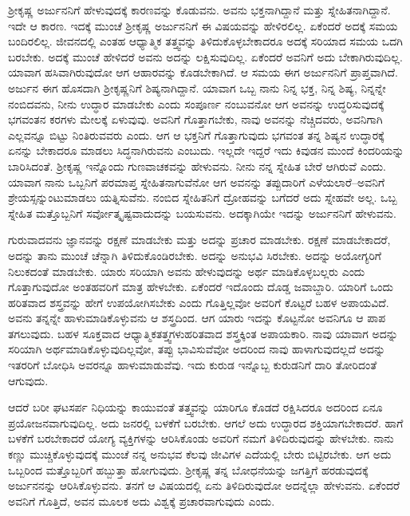 ಶ‍್ರೀಕೃಷ್ಣ ಅರ್ಜುನನಿಗೆ ಹೇಳುವುದಕ್ಕೆ ಕಾರಣವನ್ನು ಕೊಡುವನು. ಅವನು ಭಕ್ತನಾಗಿದ್ದಾನೆ ಮತ್ತು ಸ್ನೇಹಿತನಾಗಿದ್ದಾನೆ. ಇದೇ ಆ ಕಾರಣ. ಇದಕ್ಕೆ ಮುಂಚೆ ಶ‍್ರೀಕೃಷ್ಣ ಅರ್ಜುನನಿಗೆ ಈ ವಿಷಯವನ್ನು ಹೇಳಿರಲಿಲ್ಲ. ಏಕೆಂದರೆ ಅದಕ್ಕೆ ಸಮಯ ಬಂದಿರಲಿಲ್ಲ. ಜೀವನದಲ್ಲಿ ಎಂತಹ ಆಧ್ಯಾತ್ಮಿಕ ತತ್ತ್ವವನ್ನು ತಿಳಿದುಕೊಳ್ಳಬೇಕಾದರೂ ಅದಕ್ಕೆ ಸರಿಯಾದ ಸಮಯ ಒದಗಿ ಬರಬೇಕು. ಅದಕ್ಕೆ ಮುಂಚೆ ಹೇಳಿದರೆ ಅವನು ಅದನ್ನು ಲಕ್ಷಿಸುವುದಿಲ್ಲ. ಏಕೆಂದರೆ ಅವನಿಗೆ ಅದು ಬೇಕಾಗಿರುವುದಿಲ್ಲ. ಯಾವಾಗ ಹಸಿವಾಗಿರುವುದೋ ಆಗ ಆಹಾರವನ್ನು ಕೊಡಬೇಕಾಗಿದೆ. ಆ ಸಮಯ ಈಗ ಅರ್ಜುನನಿಗೆ ಪ್ರಾಪ್ತವಾಗಿದೆ. ಅರ್ಜುನ ಈಗ ಹೊಸದಾಗಿ ಶ‍್ರೀಕೃಷ್ಣನಿಗೆ ಶಿಷ್ಯನಾಗಿದ್ದಾನೆ. ಯಾವಾಗ ಒಬ್ಬ ನಾನು ನಿನ್ನ ಭಕ್ತ, ನಿನ್ನ ಶಿಷ್ಯ, ನಿನ್ನನ್ನೇ ನಂಬಿದವನು, ನೀನು ಉದ್ಧಾರ ಮಾಡಬೇಕು ಎಂದು ಸಂಪೂರ್ಣ ನಂಬುವನೋ ಆಗ ಅವನನ್ನು ಉದ್ಧರಿಸುವುದಕ್ಕೆ ಭಗವಂತನ ಕರಗಳು ಮೇಲಕ್ಕೆ ಏಳುವುವು. ಅವನಿಗೆ ಗೊತ್ತಾಗಬೇಕು, ನಾವು ಅವನನ್ನು ನೆಚ್ಚಿದವರು, ಅವನಿಗಾಗಿ ಎಲ್ಲವನ್ನೂ ಬಿಟ್ಟು ನಿಂತಿರುವವರು ಎಂದು. ಆಗ ಆ ಭಕ್ತನಿಗೆ ಗೊತ್ತಾಗುವುದು ಭಗವಂತ ತನ್ನ ಶಿಷ್ಯನ ಉದ್ಧಾರಕ್ಕೆ ಏನನ್ನು ಬೇಕಾದರೂ ಮಾಡಲು ಸಿದ್ಧನಾಗಿರುವನು ಎಂಬುದು. ಇಲ್ಲದೇ ಇದ್ದರೆ ಇದು ಕಿವುಡನ ಮುಂದೆ ಕಿಂದರಿಯನ್ನು ಬಾರಿಸಿದಂತೆ. ಶ‍್ರೀಕೃಷ್ಣ ಇನ್ನೊಂದು ಗುಣವಾಚಕವನ್ನು ಹೇಳುವನು. ನೀನು ನನ್ನ ಸ್ನೇಹಿತ ಬೇರೆ ಆಗಿರುವೆ ಎಂದು. ಯಾವಾಗ ನಾನು ಒಬ್ಬನಿಗೆ ಪರಮಾಪ್ತ ಸ್ನೇಹಿತನಾಗುವೆನೋ ಆಗ ಅವನನ್ನು ತಪ್ಪುದಾರಿಗೆ ಎಳೆಯಲಾರೆ–ಅವನಿಗೆ ಶ್ರೇಯಸ್ಸನ್ನುಂಟುಮಾಡಲು ಯತ್ನಿಸುವೆನು. ನಂಬಿದ ಸ್ನೇಹಿತನಿಗೆ ದ್ರೋಹವನ್ನು ಬಗೆದರೆ ಅದು ಸ್ನೇಹವೇ ಅಲ್ಲ. ಒಬ್ಬ ಸ್ನೇಹಿತ ಮತ್ತೊಬ್ಬನಿಗೆ ಸರ್ವೋತ್ಕೃಷ್ಟವಾದುದನ್ನು ಬಯಸುವನು. ಅದಕ್ಕಾಗಿಯೇ ಇದನ್ನು ಅರ್ಜುನನಿಗೆ ಹೇಳುವನು.

ಗುರುವಾದವನು ಜ್ಞಾನವನ್ನು ರಕ್ಷಣೆ ಮಾಡಬೇಕು ಮತ್ತು ಅದನ್ನು ಪ್ರಚಾರ ಮಾಡಬೇಕು. ರಕ್ಷಣೆ ಮಾಡಬೇಕಾದರೆ, ಅದನ್ನು ತಾನು ಮುಂಚೆ ಚೆನ್ನಾಗಿ ತಿಳಿದುಕೊಂಡಿರಬೇಕು. ಅದನ್ನು ಅನುಭವಿ ಸಿರಬೇಕು. ಅದನ್ನು ಅಯೋಗ್ಯರಿಗೆ ನಿಲುಕದಂತೆ ಮಾಡಬೇಕು. ಯಾರು ಸರಿಯಾಗಿ ಅವನು ಹೇಳುವುದನ್ನು ಅರ್ಥ ಮಾಡಿಕೊಳ್ಳಬಲ್ಲರು ಎಂದು ಗೊತ್ತಾಗುವುದೋ ಅಂತಹವರಿಗೆ ಮಾತ್ರ ಹೇಳಬೇಕು. ಏಕೆಂದರೆ ಇದೊಂದು ದೊಡ್ಡ ಜವಾಬ್ದಾರಿ. ಯಾರಿಗೆ ಒಂದು ಹರಿತವಾದ ಶಸ್ತ್ರವನ್ನು ಹೇಗೆ ಉಪಯೋಗಿಸಬೇಕು ಎಂದು ಗೊತ್ತಿಲ್ಲವೋ ಅವರಿಗೆ ಕೊಟ್ಟರೆ ಬಹಳ ಅಪಾಯವಿದೆ. ಅವನು ತನ್ನನ್ನೇ ಹಾಳುಮಾಡಿಕೊಳ್ಳುವನು ಆ ಶಸ್ತ್ರದಿಂದ. ಆಗ ಯಾರು ಇದನ್ನು ಕೊಟ್ಟನೋ ಅವನಿಗೂ ಆ ಪಾಪ ತಗಲುವುದು. ಬಹಳ ಸೂಕ್ತವಾದ ಆಧ್ಯಾತ್ಮಿಕತತ್ತ್ವಗಳು\break ಹರಿತವಾದ ಶಸ್ತ್ರಕ್ಕಿಂತ ಅಪಾಯಕಾರಿ. ನಾವು ಯಾವಾಗ ಅದನ್ನು ಸರಿಯಾಗಿ ಅರ್ಥಮಾಡಿ\-ಕೊಳ್ಳುವು\-ದಿಲ್ಲವೋ, ತಪ್ಪು ಭಾವಿಸುವೆವೋ ಅದರಿಂದ ನಾವು ಹಾಳಾಗುವುದಲ್ಲದೆ ಅದನ್ನು ಇತರರಿಗೆ ಬೋಧಿಸಿ ಅವರನ್ನೂ ಹಾಳುಮಾಡುವೆವು. ಇದು ಕುರುಡ ಇನ್ನೊಬ್ಬ ಕುರುಡನಿಗೆ ದಾರಿ ತೋರಿದಂತೆ ಆಗುವುದು.

ಆದರೆ ಬರೀ ಘಟಸರ್ಪ ನಿಧಿಯನ್ನು ಕಾಯುವಂತೆ ತತ್ತ್ವವನ್ನು ಯಾರಿಗೂ ಕೊಡದೆ ರಕ್ಷಿಸಿದರೂ ಅದರಿಂದ ಏನೂ ಪ್ರಯೋಜನವಾಗುವುದಿಲ್ಲ. ಅದು ಜನರಲ್ಲಿ ಬಳಕೆಗೆ ಬರಬೇಕು. ಆಗಲೆ ಅದು ಉದ್ಧಾರದ ಶಕ್ತಿಯಾಗಬೇಕಾದರೆ. ಹಾಗೆ ಬಳಕೆಗೆ ಬರಬೇಕಾದರೆ ಯೋಗ್ಯ ವ್ಯಕ್ತಿಗಳನ್ನು ಆರಿಸಿಕೊಂಡು ಅವರಿಗೆ ನಮಗೆ ತಿಳಿದಿರುವುದನ್ನು ಹೇಳಬೇಕು. ನಾನು ಕಣ್ಣು ಮುಚ್ಚಿಕೊಳ್ಳುವುದಕ್ಕೆ ಮುಂಚೆ ನನ್ನ ಅನುಭವ ಕೆಲವು ಜೀವಿಗಳ ಎದೆಯಲ್ಲಿ ಬೇರು ಬಿಟ್ಟಿರಬೇಕು. ಆಗ ಅದು ಒಬ್ಬರಿಂದ ಮತ್ತೊಬ್ಬರಿಗೆ ಹಬ್ಬುತ್ತಾ ಹೋಗುವುದು. ಶ‍್ರೀಕೃಷ್ಣ ತನ್ನ ಬೋಧನೆಯನ್ನು ಜಗತ್ತಿಗೆ ಹರಡುವುದಕ್ಕೆ ಅರ್ಜುನನನ್ನು ಆರಿಸಿಕೊಳ್ಳುವನು. ತನಗೆ ಆ ವಿಷಯದಲ್ಲಿ ಏನು ತಿಳಿದಿರುವುದೋ ಅದನ್ನೆಲ್ಲಾ ಹೇಳುವನು. ಏಕೆಂದರೆ ಅವನಿಗೆ ಗೊತ್ತಿದೆ, ಅವನ ಮೂಲಕ ಅದು ವಿಶ್ವಕ್ಕೆ ಪ್ರಚಾರವಾಗುವುದು ಎಂದು.

